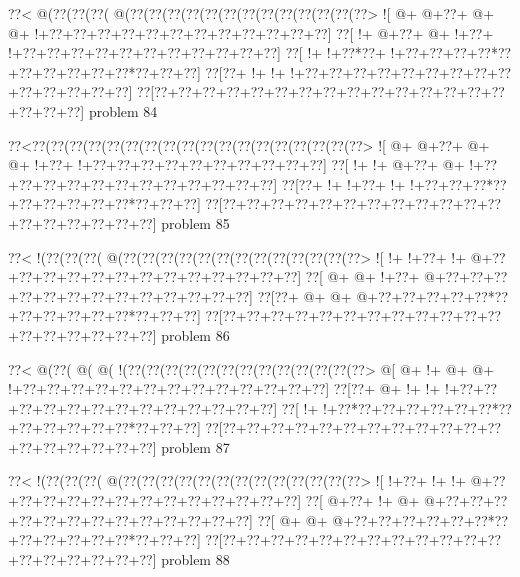 \vbox{\vbox{\goo
\0??<\- @(\0??(\0??(\0??(\- @(\0??(\0??(\0??(\0??(\0??(\0??(\0??(\0??(\0??(\0??(\0??(\0??(\0??>
\- ![\- @+\- @+\0??+\- @+\- @+\- !+\0??+\0??+\0??+\0??+\0??+\0??+\0??+\0??+\0??+\0??+\0??+\0??]
\0??[\- !+\- @+\0??+\- @+\- !+\0??+\- !+\0??+\0??+\0??+\0??+\0??+\0??+\0??+\0??+\0??+\0??+\0??]
\0??[\- !+\- !+\0??*\0??+\- !+\0??+\0??+\0??+\0??*\0??+\0??+\0??+\0??+\0??+\0??*\0??+\0??+\0??]
\0??[\0??+\- !+\- !+\- !+\0??+\0??+\0??+\0??+\0??+\0??+\0??+\0??+\0??+\0??+\0??+\0??+\0??+\0??]
\0??[\0??+\0??+\0??+\0??+\0??+\0??+\0??+\0??+\0??+\0??+\0??+\0??+\0??+\0??+\0??+\0??+\0??+\0??]
}
\hfil problem 84\hfil\break
}



\vbox{\vbox{\goo
\0??<\0??(\0??(\0??(\0??(\0??(\0??(\0??(\0??(\0??(\0??(\0??(\0??(\0??(\0??(\0??(\0??(\0??(\0??>
\- ![\- @+\- @+\0??+\- @+\- @+\- !+\0??+\- !+\0??+\0??+\0??+\0??+\0??+\0??+\0??+\0??+\0??+\0??]
\0??[\- !+\- !+\- @+\0??+\- @+\- !+\0??+\0??+\0??+\0??+\0??+\0??+\0??+\0??+\0??+\0??+\0??+\0??]
\0??[\0??+\- !+\- !+\0??+\- !+\- !+\0??+\0??+\0??*\0??+\0??+\0??+\0??+\0??+\0??*\0??+\0??+\0??]
\0??[\0??+\0??+\0??+\0??+\0??+\0??+\0??+\0??+\0??+\0??+\0??+\0??+\0??+\0??+\0??+\0??+\0??+\0??]
}
\hfil problem 85\hfil\break
}



\vbox{\vbox{\goo
\0??<\- !(\0??(\0??(\0??(\- @(\0??(\0??(\0??(\0??(\0??(\0??(\0??(\0??(\0??(\0??(\0??(\0??(\0??>
\- ![\- !+\- !+\0??+\- !+\- @+\0??+\0??+\0??+\0??+\0??+\0??+\0??+\0??+\0??+\0??+\0??+\0??+\0??]
\0??[\- @+\- @+\- !+\0??+\- @+\0??+\0??+\0??+\0??+\0??+\0??+\0??+\0??+\0??+\0??+\0??+\0??+\0??]
\0??[\0??+\- @+\- @+\- @+\0??+\0??+\0??+\0??+\0??*\0??+\0??+\0??+\0??+\0??+\0??*\0??+\0??+\0??]
\0??[\0??+\0??+\0??+\0??+\0??+\0??+\0??+\0??+\0??+\0??+\0??+\0??+\0??+\0??+\0??+\0??+\0??+\0??]
}
\hfil problem 86\hfil\break
}



\vbox{\vbox{\goo
\0??<\- @(\0??(\- @(\- @(\- !(\0??(\0??(\0??(\0??(\0??(\0??(\0??(\0??(\0??(\0??(\0??(\0??(\0??>
\- @[\- @+\- !+\- @+\- @+\- !+\0??+\0??+\0??+\0??+\0??+\0??+\0??+\0??+\0??+\0??+\0??+\0??+\0??]
\0??[\0??+\- @+\- !+\- !+\- !+\0??+\0??+\0??+\0??+\0??+\0??+\0??+\0??+\0??+\0??+\0??+\0??+\0??]
\0??[\- !+\- !+\0??*\0??+\0??+\0??+\0??+\0??+\0??*\0??+\0??+\0??+\0??+\0??+\0??*\0??+\0??+\0??]
\0??[\0??+\0??+\0??+\0??+\0??+\0??+\0??+\0??+\0??+\0??+\0??+\0??+\0??+\0??+\0??+\0??+\0??+\0??]
}
\hfil problem 87\hfil\break
}



\vbox{\vbox{\goo
\0??<\- !(\0??(\0??(\0??(\- @(\0??(\0??(\0??(\0??(\0??(\0??(\0??(\0??(\0??(\0??(\0??(\0??(\0??>
\- ![\- !+\0??+\- !+\- !+\- @+\0??+\0??+\0??+\0??+\0??+\0??+\0??+\0??+\0??+\0??+\0??+\0??+\0??]
\0??[\- @+\0??+\- !+\- @+\- @+\0??+\0??+\0??+\0??+\0??+\0??+\0??+\0??+\0??+\0??+\0??+\0??+\0??]
\0??[\- @+\- @+\- @+\0??+\0??+\0??+\0??+\0??+\0??*\0??+\0??+\0??+\0??+\0??+\0??*\0??+\0??+\0??]
\0??[\0??+\0??+\0??+\0??+\0??+\0??+\0??+\0??+\0??+\0??+\0??+\0??+\0??+\0??+\0??+\0??+\0??+\0??]
}
\hfil problem 88\hfil\break
}



